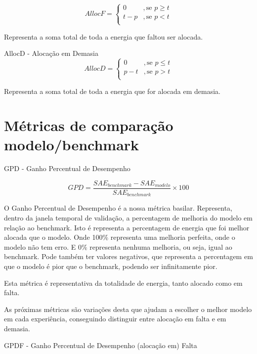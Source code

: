 \begin{equation} \label{eq:allocf} 
    AllocF = 
    \begin{cases} 
        0 & , \text{se } p \geq t \\
        t - p  & , \text{se } p < t \\
    \end{cases} 
\end{equation}
\smallskip

Representa a soma total de toda a energia que faltou ser alocada.\par
\bigskip
AllocD - Alocação em Demasia \\

\begin{equation} \label{eq:allocd} 
    AllocD = 
    \begin{cases} 
        0 & , \text{se } p \leq t \\
        p - t  & , \text{se } p > t \\
    \end{cases} 
\end{equation}
\smallskip

Representa a soma total de toda a energia que for alocada em demasia.\par

\section{Métricas de comparação modelo/benchmark}

GPD - Ganho Percentual de Desempenho

\begin{equation} \label{eq:gpd} 
    GPD = \frac{SAE_{benchmark} - SAE_{modelo}}{SAE_{benchmark}} \times 100
\end{equation}
\smallskip

O Ganho Percentual de Desempenho é a nossa métrica basilar. Representa, dentro da janela temporal de validação, a percentagem de melhoria do modelo em relação ao benchmark. Isto é representa a percentagem de energia que foi melhor alocada que o modelo. Onde 100\% representa uma melhoria perfeita, onde o modelo não tem erro. E 0\% representa nenhuma melhoria, ou seja, igual ao benchmark. Pode também ter valores negativos, que representa a percentagem em que o modelo é pior que o benchmark, podendo ser infinitamente pior.\par
Esta métrica é representativa da totalidade de energia, tanto alocado como em falta.\par
As próximas métricas são variações desta que ajudam a escolher o melhor modelo em cada experiência, conseguindo distinguir entre alocação em falta e em demasia.\par
\bigskip
GPDF - Ganho Percentual de Desempenho (alocação em) Falta\\


